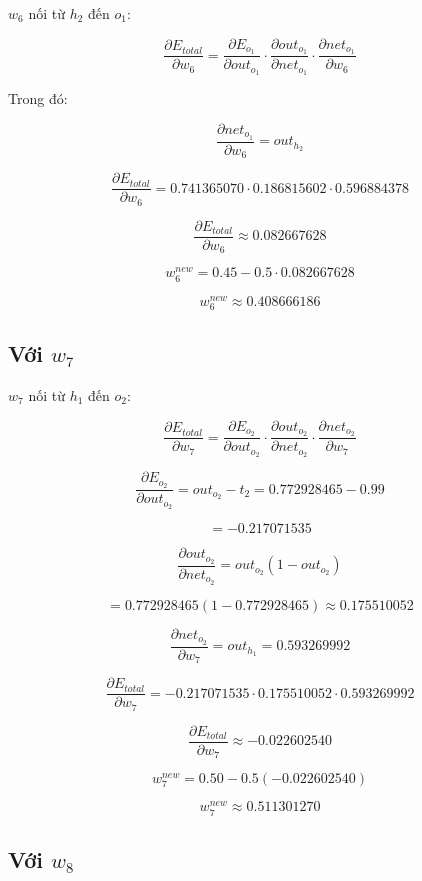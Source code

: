 $w_6$ nối từ $h_2$ đến $o_1$:

\[
    \frac{\partial E_{total}}{\partial w_6}
    =
    \frac{\partial E_{o_1}}{\partial out_{o_1}}
    \cdot
    \frac{\partial out_{o_1}}{\partial net_{o_1}}
    \cdot
    \frac{\partial net_{o_1}}{\partial w_6}
\]

Trong đó:

\[
    \frac{\partial net_{o_1}}{\partial w_6}=out_{h_2}
\]

\[
    \frac{\partial E_{total}}{\partial w_6}
    =
    0.741365070
    \cdot
    0.186815602
    \cdot
    0.596884378
\]

\[
    \frac{\partial E_{total}}{\partial w_6}
    \approx 0.082667628
\]

\[
    w_6^{new}
    =
    0.45
    -
    0.5\cdot 0.082667628
\]

\[
    w_6^{new}\approx 0.408666186
\]

\subsection*{Với $w_7$}

$w_7$ nối từ $h_1$ đến $o_2$:

\[
    \frac{\partial E_{total}}{\partial w_7}
    =
    \frac{\partial E_{o_2}}{\partial out_{o_2}}
    \cdot
    \frac{\partial out_{o_2}}{\partial net_{o_2}}
    \cdot
    \frac{\partial net_{o_2}}{\partial w_7}
\]

\[
    \frac{\partial E_{o_2}}{\partial out_{o_2}}
    =
    out_{o_2}-t_2
    =
    0.772928465-0.99
\]

\[
    =
    -0.217071535
\]

\[
    \frac{\partial out_{o_2}}{\partial net_{o_2}}
    =
    out_{o_2}(1-out_{o_2})
\]

\[
    =
    0.772928465(1-0.772928465)
    \approx 0.175510052
\]

\[
    \frac{\partial net_{o_2}}{\partial w_7}
    =
    out_{h_1}
    =
    0.593269992
\]

\[
    \frac{\partial E_{total}}{\partial w_7}
    =
    -0.217071535
    \cdot
    0.175510052
    \cdot
    0.593269992
\]

\[
    \frac{\partial E_{total}}{\partial w_7}
    \approx -0.022602540
\]

\[
    w_7^{new}
    =
    0.50
    -
    0.5(-0.022602540)
\]

\[
    w_7^{new}
    \approx 0.511301270
\]

\subsection*{Với $w_8$}

